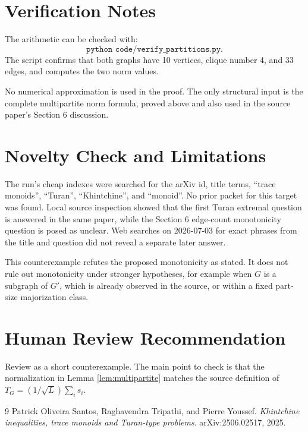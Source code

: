 \documentclass[11pt]{article}
\begin{document}
\section{Verification Notes}

The arithmetic can be checked with:
\[
\texttt{python code/verify\_partitions.py}.
\]
The script confirms that both graphs have 10 vertices, clique number 4, and 33
edges, and computes the two norm values.

No numerical approximation is used in the proof.  The only structural input is
the complete multipartite norm formula, proved above and also used in the
source paper's Section 6 discussion.

\section{Novelty Check and Limitations}

The run's cheap indexes were searched for the arXiv id, title terms,
``trace monoids'', ``Turan'', ``Khintchine'', and ``monoid''.  No prior packet
for this target was found.  Local source inspection showed that the first
Turan extremal question is answered in the same paper, while the Section 6
edge-count monotonicity question is posed as unclear.  Web searches on
2026-07-03 for exact phrases from the title and question did not reveal a
separate later answer.

This counterexample refutes the proposed monotonicity as stated.  It does not
rule out monotonicity under stronger hypotheses, for example when $G$ is a
subgraph of $G'$, which is already observed in the source, or within a fixed
part-size majorization class.

\section{Human Review Recommendation}

Review as a short counterexample.  The main point to check is that the
normalization in Lemma \ref{lem:multipartite} matches the source definition of
$T_G=(1/\sqrt L)\sum_i s_i$.

\begin{thebibliography}{9}
Patrick Oliveira Santos, Raghavendra Tripathi, and Pierre Youssef.
\newblock \emph{Khintchine inequalities, trace monoids and Turan-type problems}.
\newblock arXiv:2506.02517, 2025.
\end{thebibliography}
\end{document}

